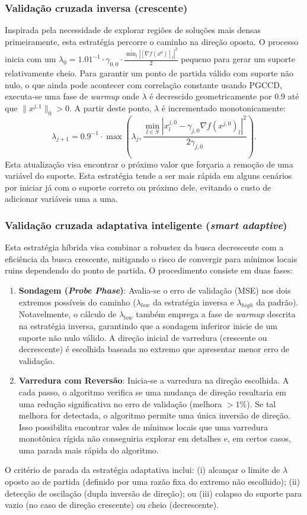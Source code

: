 \subsubsection{Validação cruzada inversa (crescente)}
Inspirada pela necessidade de explorar regiões de soluções mais densas primeiramente, esta estratégia percorre o caminho na direção oposta. O processo inicia com um $\lambda_0 = 1.01^{-1} \cdot \gamma_{0,0} \cdot \frac{\min_l |[\nabla f(x^0)]_l|^2}{2}$ pequeno para gerar um suporte relativamente cheio. Para garantir um ponto de partida válido com suporte não nulo, o que ainda pode acontecer com correlação constante usando PGCCD, executa-se uma fase de \textit{warmup} onde $\lambda$ é decrescido geometricamente por $0.9$ até que $\|x^{j,1}\|_0 > 0$.
A partir deste ponto, $\lambda$ é incrementado monotonicamente:
\[
\lambda_{j+1} = 0.9^{-1} \cdot \max\left(\lambda_j, \frac{\min_{l \in S} |x^{j,0}_l - \gamma_{j,0} \nabla f(x^{j,0})_l|^2}{2\gamma_{j,0}}\right).
\]
Esta atualização visa encontrar o próximo valor que forçaria a remoção de uma variável do suporte. Esta estratégia tende a ser mais rápida em alguns cenários por iniciar já com o suporte correto ou próximo dele, evitando o custo de adicionar variáveis uma a uma.

\subsubsection{Validação cruzada adaptativa inteligente (\textit{smart adaptive})}
Esta estratégia híbrida visa combinar a robustez da busca decrescente com a eficiência da busca crescente, mitigando o risco de convergir para mínimos locais ruins dependendo do ponto de partida.
O procedimento consiste em duas fases:
\begin{enumerate}
    \item \textbf{Sondagem (\textit{Probe Phase})}: Avalia-se o erro de validação (MSE) nos dois extremos possíveis do caminho ($\lambda_{low}$ da estratégia inversa e $\lambda_{high}$ da padrão). Notavelmente, o cálculo de $\lambda_{low}$ também emprega a fase de \textit{warmup} descrita na estratégia inversa, garantindo que a sondagem inferiror inicie de um suporte não nulo válido. A direção inicial de varredura (crescente ou decrescente) é escolhida baseada no extremo que apresentar menor erro de validação.
    \item \textbf{Varredura com Reversão}: Inicia-se a varredura na direção escolhida. A cada passo, o algoritmo verifica se uma mudança de direção resultaria em uma redução significativa no erro de validação (melhora $> 1\%$). Se tal melhora for detectada, o algoritmo permite uma única inversão de direção. Isso possibilita encontrar vales de mínimos locais que uma varredura monotônica rígida não conseguiria explorar em detalhes e, em certos casos, uma parada mais rápida do algoritmo.
\end{enumerate}
O critério de parada da estratégia adaptativa inclui: (i) alcançar o limite de $\lambda$ oposto ao de partida (definido por uma razão fixa do extremo não escolhido); (ii) detecção de oscilação (dupla inversão de direção); ou (iii) colapso do suporte para vazio (no caso de direção crescente) ou cheio (decrescente).

